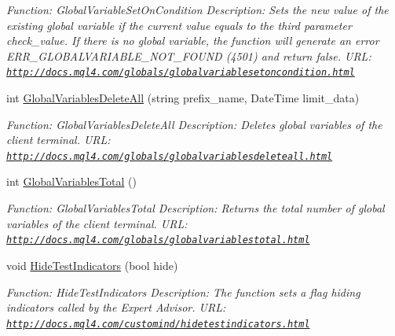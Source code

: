 \begin{DoxyCompactItemize}
\begin{DoxyCompactList}\small\item\em Function\+: Global\+Variable\+Set\+On\+Condition Description\+: Sets the new value of the existing global variable if the current value equals to the third parameter check\+\_\+value. If there is no global variable, the function will generate an error E\+R\+R\+\_\+\+G\+L\+O\+B\+A\+L\+V\+A\+R\+I\+A\+B\+L\+E\+\_\+\+N\+O\+T\+\_\+\+F\+O\+U\+ND (4501) and return false. U\+RL\+: \href{http://docs.mql4.com/globals/globalvariablesetoncondition.html}{\tt http\+://docs.\+mql4.\+com/globals/globalvariablesetoncondition.\+html} \end{DoxyCompactList}\item 
int \hyperlink{class_m_q_l4_c_sharp_1_1_base_1_1_m_q_l_base_a03ba5af8ff5cf3bd56ea9a86f3b93cd7}{Global\+Variables\+Delete\+All} (string prefix\+\_\+name, Date\+Time limit\+\_\+data)
\begin{DoxyCompactList}\small\item\em Function\+: Global\+Variables\+Delete\+All Description\+: Deletes global variables of the client terminal. U\+RL\+: \href{http://docs.mql4.com/globals/globalvariablesdeleteall.html}{\tt http\+://docs.\+mql4.\+com/globals/globalvariablesdeleteall.\+html} \end{DoxyCompactList}\item 
int \hyperlink{class_m_q_l4_c_sharp_1_1_base_1_1_m_q_l_base_a92dd485913831e1866ad2086ef6e5b0d}{Global\+Variables\+Total} ()
\begin{DoxyCompactList}\small\item\em Function\+: Global\+Variables\+Total Description\+: Returns the total number of global variables of the client terminal. U\+RL\+: \href{http://docs.mql4.com/globals/globalvariablestotal.html}{\tt http\+://docs.\+mql4.\+com/globals/globalvariablestotal.\+html} \end{DoxyCompactList}\item 
void \hyperlink{class_m_q_l4_c_sharp_1_1_base_1_1_m_q_l_base_a25f92eeb274262745a42c2693eae1098}{Hide\+Test\+Indicators} (bool hide)
\begin{DoxyCompactList}\small\item\em Function\+: Hide\+Test\+Indicators Description\+: The function sets a flag hiding indicators called by the Expert Advisor. U\+RL\+: \href{http://docs.mql4.com/customind/hidetestindicators.html}{\tt http\+://docs.\+mql4.\+com/customind/hidetestindicators.\+html} \end{DoxyCompactList}\item 

\end{DoxyCompactItemize}
